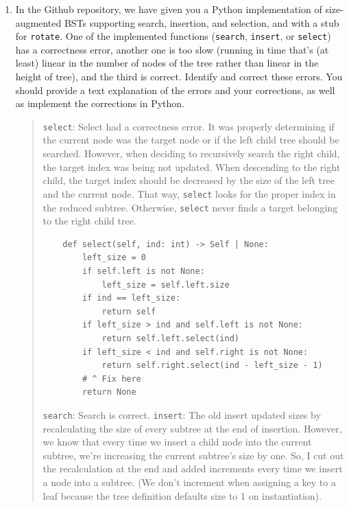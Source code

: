 \documentclass[11pt]{article}
\begin{document}
\begin{enumerate}
    \begin{enumerate}
        \item In the Github repository, we have given you a Python implementation of size-augmented BSTs supporting search, insertion, and selection, and with a stub for \texttt{rotate}. One of the implemented functions (\texttt{search}, \texttt{insert}, or \texttt{select}) has a correctness error, another one is too slow (running in time that's (at least) linear in the number of nodes of the tree rather than linear in the height of tree), and the third is correct. 
        Identify and correct these errors. You should provide a text explanation of the errors and your corrections, as well as implement the corrections in Python.
        \begin{quote}
        \newpage
            \color{purple}
            \texttt{select}: \newline 
            Select had a correctness error. It was properly determining if the current node was the target node or if the left child tree should be searched. However, when deciding to recursively search the right child, the target index was being not updated. \newline 
            When descending to the right child, the target index should be decreased by the size of the left tree and the current node. That way, \texttt{select} looks for the proper index in the reduced subtree. Otherwise, \texttt{select} never finds a target belonging to the right child tree.
           \newline 
           \begin{verbatim}
    def select(self, ind: int) -> Self | None:
        left_size = 0
        if self.left is not None:
            left_size = self.left.size
        if ind == left_size:
            return self
        if left_size > ind and self.left is not None:
            return self.left.select(ind)
        if left_size < ind and self.right is not None:
            return self.right.select(ind - left_size - 1)
        # ^ Fix here
        return None
           \end{verbatim}
           \vspace{1em}
           \texttt{search}: \newline 
           Search is correct.
           \newline
           \newpage
           \texttt{insert}: \newline 
           The old insert updated sizes by recalculating the size of every subtree at the end of insertion. However, we know that every time we insert a child node into the current subtree, we're increasing the current subtree's size by one. So, I cut out the recalculation at the end and added increments every time we insert a node into a subtree. (We don't increment when assigning a key to a leaf because the tree definition defaults size to 1 on instantiation).

\end{quote}
\end{enumerate}
\end{enumerate}
\end{document}
